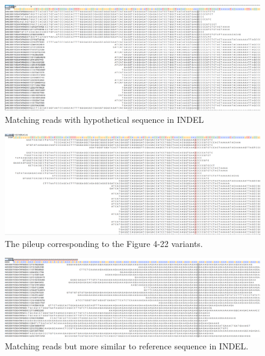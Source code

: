 \begin{figure}[H]
\centering
\includegraphics[width=1\columnwidth]{body/image/indel_new_ALTread.png}
\caption[INDEL match reads]{Matching reads with hypothetical sequence in INDEL}
\label{indel_new_ALTread}
\end{figure}

\begin{figure}[H]
\centering
\includegraphics[width=1\columnwidth]{body/image/indel_pileup_ALTread.png}
\caption[Figure 4.22 pileup]{The pileup corresponding to the Figure 4-22 variants.}
\label{indel_pileup_ALTread}
\end{figure}

\begin{figure}[H]
\centering
\includegraphics[width=1\columnwidth]{body/image/indel_new_REFread.png}
\caption[INDEL worse match reads]{Matching reads but more similar to reference sequence in INDEL.}
\label{indel_new_REFread}
\end{figure}

